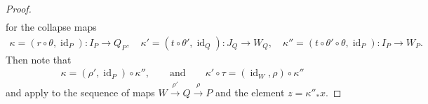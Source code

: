 \documentclass[12pt, reqno]{amsart}
\theoremstyle{plain}
\theoremstyle{definition}
\begin{document}
\begin{proof}
\begin{align*}
\end{align*}
for the collapse maps
\begin{align*}
\kappa=(r\circ\theta, \operatorname{id}_P)\colon I_P\rightarrow Q_P,\quad\kappa'=(t\circ \theta',\operatorname{id}_Q)\colon J_Q\rightarrow W_Q,\quad\kappa''=(t\circ\theta'\circ\theta,\operatorname{id}_P)\colon I_P\rightarrow W_P.
\end{align*}
Then note that
\begin{align*}
\kappa=(\rho',\operatorname{id}_P)\circ \kappa'',\qquad\text{and}\qquad \kappa'\circ \tau=(\operatorname{id}_W, \rho)\circ \kappa''
\end{align*}
and apply  to the sequence of maps $W\xrightarrow{\rho'}Q\xrightarrow{\rho} P$ and the element $z=\kappa''_*x$.
\end{proof}
\end{document}
